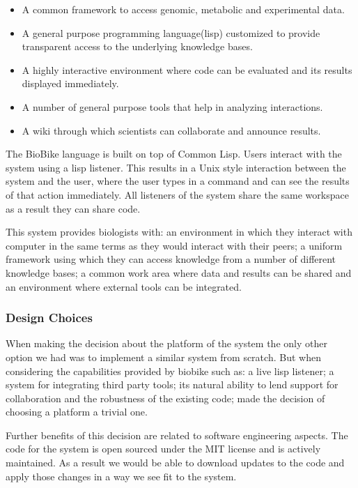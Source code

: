 \begin{itemize}
\item A common framework to access genomic, metabolic and experimental data.
\item A general purpose programming language(lisp) customized to
  provide transparent access to the underlying knowledge bases.
\item A highly interactive environment where code can be evaluated and
  its results displayed immediately.
\item A number of general purpose tools that help in analyzing interactions.
\item A wiki through which scientists can collaborate and announce results.
\end{itemize}

The BioBike language is built on top of Common Lisp. Users interact
with the system using a lisp listener. This results in a Unix style
interaction between the system and the user, where the user types in a
command and can see the results of that action immediately. All
listeners of the system share the same workspace as a result they can
share code.

This system provides biologists with: an environment in which they
interact with computer in the same terms as they would interact with
their peers; a uniform framework using which they can access knowledge
from a number of different knowledge bases; a common work area where
data and results can be shared and an environment where external tools
can be integrated.

\subsubsection{Design Choices}

When making the decision about the platform of the system the only
other option we had was to implement a similar system from
scratch. But when considering the capabilities provided by biobike
such as: a live lisp listener; a system for integrating third party
tools; its natural ability to lend support for collaboration and the
robustness of the existing code; made the decision of choosing a
platform a trivial one.

Further benefits of this decision are related to software engineering
aspects. The code for the system is open sourced under the MIT
license and is actively maintained. As a result we would be able to
download updates to the code and apply those changes in a way we see
fit to the system.

